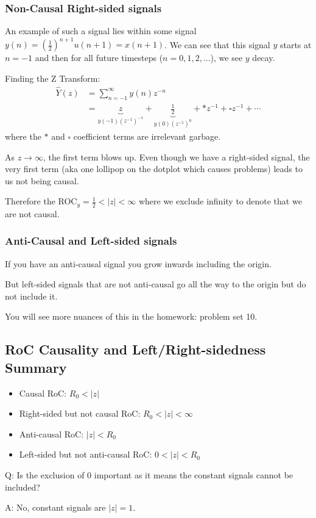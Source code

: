 \subsubsection{Non-Causal Right-sided signals}
An example of such a signal lies within some signal $y(n)=\left(\frac12\right)^{n+1} u(n+1)=x(n+1)$. We can see that this signal $y$ starts at $n=-1$ and then for all future timesteps ($n=0,1,2,\ldots$), we see $y$ decay.

Finding the Z Transform:
\begin{align*}
    \hat Y(z) 
    &= \sum_{n=-1}^\infty y(n) z^{-n} 
    \\
    &= \underbrace{z}_{y(-1)(z^{-1})^{-1}} + \underbrace{\frac12}_{y(0)(z^{-1})^{0}}
    + \ast z^{-1} + \square z^{-1} + \cdots
\end{align*}
where the $\ast$ and $\square$ coefficient terms are irrelevant garbage.

As $z\to\infty$, the first term blows up. Even though we have a right-sided signal, the very first term (aka one lollipop on the dotplot which causes problems) leads to us not being causal.

Therefore the ROC$_y = \frac12<|z|<\infty$ where we exclude infinity to denote that we are not causal.

\subsubsection{Anti-Causal and Left-sided signals}
If you have an anti-causal signal you grow inwards including the origin.

But left-sided signals that are not anti-causal go all the way to the origin but do not include it.

You will see more nuances of this in the homework: problem set 10.

\subsection{ RoC Causality and Left/Right-sidedness Summary}
\begin{itemize}
    \item Causal RoC: $R_0<|z|$
    \item Right-sided but not causal RoC: $R_0<|z|<\infty$
    \item Anti-causal RoC: $|z|<R_0$
    \item Left-sided but not anti-causal RoC: $0<|z|<R_0$
\end{itemize}
\begin{shaded}
Q: Is the exclusion of 0 important as it means the constant signals cannot be included?
\end{shaded}
A: No, constant signals are $|z|=1$.

